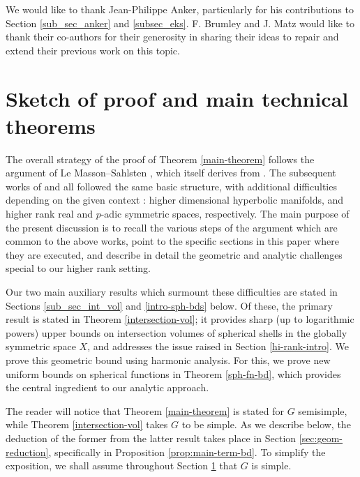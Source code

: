 \documentclass[12pt]{amsart}
\theoremstyle{remark}
\begin{document}
We would like to thank Jean-Philippe Anker, particularly for his contributions to Section \ref{sub_sec_anker} and \ref{subsec_eks}. F. Brumley and J. Matz would like to thank their co-authors for their generosity in sharing their ideas to repair and extend their previous work on this topic. 

\section{Sketch of proof and main technical theorems}\label{sec:technical-thms}

The overall strategy of the proof of Theorem \ref{main-theorem} follows the argument of Le Masson--Sahlsten \cite{Le_Masson_Sahlsten_17}, which itself derives from \cite{Brooks_Le_Masson_Lindenstrauss}. The subsequent works of \cite{Abert_Bergeron_Le_Masson_22} and \cite{Brumley_Matz_23, Peterson_thesis} all followed the same basic structure, with additional difficulties depending on the given context : higher dimensional hyperbolic manifolds, and higher rank real and $p$-adic symmetric spaces, respectively. The main purpose of the present discussion is to recall the various steps of the argument which are common to the above works, point to the specific sections in this paper where they are executed, and describe in detail the geometric and analytic challenges special to our higher rank setting. 

Our two main auxiliary results which surmount these difficulties are stated in Sections \ref{sub_sec_int_vol} and \ref{intro-sph-bds} below. Of these, the primary result is stated in Theorem \ref{intersection-vol}; it provides sharp (up to logarithmic powers) upper bounds on intersection volumes of spherical shells in the globally symmetric space $X$, and addresses the issue raised in Section \ref{hi-rank-intro}. We prove this geometric bound using harmonic analysis. For this, we prove new uniform bounds on spherical functions in  Theorem \ref{sph-fn-bd}, which provides the central ingredient to our analytic approach.


The reader will notice that Theorem \ref{main-theorem} is stated for $G$ semisimple, while Theorem \ref{intersection-vol} takes $G$ to be simple. As we describe below, the deduction of the former from the latter result takes place in Section \ref{sec:geom-reduction}, specifically in Proposition \ref{prop:main-term-bd}. To simplify the exposition, we shall assume throughout Section \ref{sec:technical-thms} that $G$ is simple.
\end{document}
